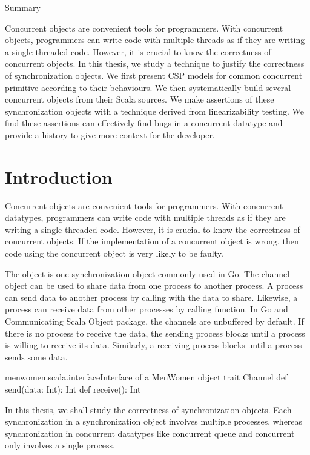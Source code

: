 \documentclass{article}
\begin{document}
Summary

Concurrent objects are convenient tools for programmers. With concurrent objects, programmers can write code with multiple threads as if they are writing a single-threaded code. However, it is crucial to know the correctness of concurrent objects. In this thesis, we study a technique to justify the correctness of synchronization objects. We first present CSP models for common concurrent primitive according to their behaviours. We then systematically build several concurrent objects from their Scala sources. We make assertions of these synchronization objects with a technique derived from linearizability testing. We find these assertions can effectively find bugs in a concurrent datatype and provide a history to give more context for the developer. 

\newpage
\section{Introduction}
Concurrent objects are convenient tools for programmers. With concurrent datatypes, programmers can write code with multiple threads as if they are writing a single-threaded code. However, it is crucial to know the correctness of concurrent objects. If the implementation of a concurrent object is wrong, then code using the concurrent object is very likely to be faulty. 

The  object is one synchronization object commonly used in Go. The channel object can be used to share data from one process to another process. A process can send data to another process by calling  with the data to share. Likewise, a process can receive data from other processes by calling  function. In Go and Communicating Scala Object package, the channels are unbuffered by default. If there is no process to receive the data, the sending process blocks until a process is willing to receive its data. Similarly, a receiving process blocks until a process sends some data. 

\begin{scalainline}{menwomen.scala.interface}{Interface of a MenWomen object}
trait Channel{
  def send(data: Int): Int
  def receive(): Int
}
\end{scalainline}

In this thesis, we shall study the correctness of synchronization objects. Each synchronization in a synchronization object involves multiple processes, whereas synchronization in concurrent datatypes like concurrent queue and concurrent only involves a single process. 
\end{document}
